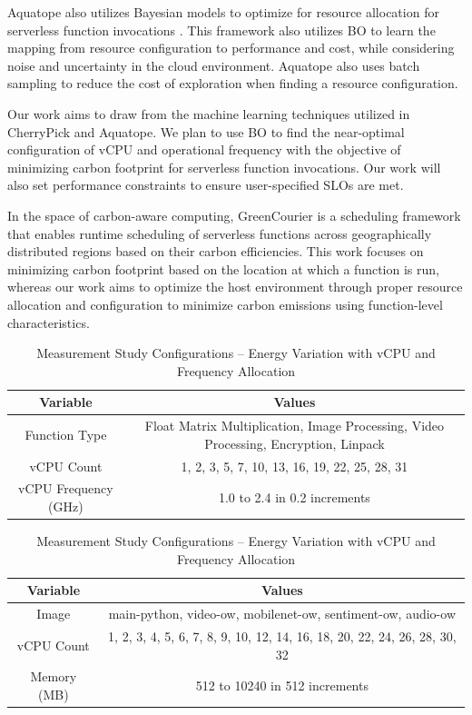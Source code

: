 \documentclass[times, 10pt,twocolumn]{article}
\begin{document}
Aquatope also utilizes Bayesian models to optimize for resource allocation for serverless function invocations \cite{AQUATOPE}. This framework also utilizes BO to learn the mapping from resource configuration to performance and cost, while considering noise and uncertainty in the cloud environment. Aquatope also uses batch sampling to reduce the cost of exploration when finding a resource configuration.

Our work aims to draw from the machine learning techniques utilized in CherryPick and Aquatope. We plan to use BO to find the near-optimal configuration of vCPU and operational frequency with the objective of minimizing carbon footprint for serverless function invocations. Our work will also set performance constraints to ensure user-specified SLOs are met.

In the space of carbon-aware computing, GreenCourier \cite{GreenCourier} is a scheduling framework that enables runtime scheduling of serverless functions across geographically distributed regions based on their carbon efficiencies. This work focuses on minimizing carbon footprint based on the location at which a function is run, whereas our work aims to optimize the host environment through proper resource allocation and configuration to minimize carbon emissions using function-level characteristics.

\begin{table}[htbp]
   \centering
   \begin{tabular}{|c|c|}
   \hline
   \textbf{Variable} & \textbf{Values} \\ \hline
   Function Type & Float Matrix Multiplication, Image Processing, Video Processing, Encryption, Linpack \\ \hline
   vCPU Count & 1, 2, 3, 5, 7, 10, 13, 16, 19, 22, 25, 28, 31 \\ \hline
   vCPU Frequency (GHz) & 1.0 to 2.4 in 0.2 increments\\ \hline
   \end{tabular}
   \caption{Measurement Study Configurations -- Energy Variation with vCPU and Frequency Allocation}
   \label{tab:mstudy1_configurations}
\end{table}

\begin{table}[htbp]
  \centering
  \begin{tabular}{|c|c|}
  \hline
  \textbf{Variable} & \textbf{Values} \\ \hline
  Image & main-python, video-ow, mobilenet-ow, sentiment-ow, audio-ow \\ \hline
  vCPU Count & 1, 2, 3, 4, 5, 6, 7, 8, 9, 10, 12, 14, 16, 18, 20, 22, 24, 26, 28, 30, 32 \\ \hline
  Memory (MB) & 512 to 10240 in 512 increments\\ \hline
  \end{tabular}
  \caption{Measurement Study Configurations -- Energy Variation with vCPU and Frequency Allocation}
  \label{tab:mstudy1_configurations}
\end{table}
\end{document}
